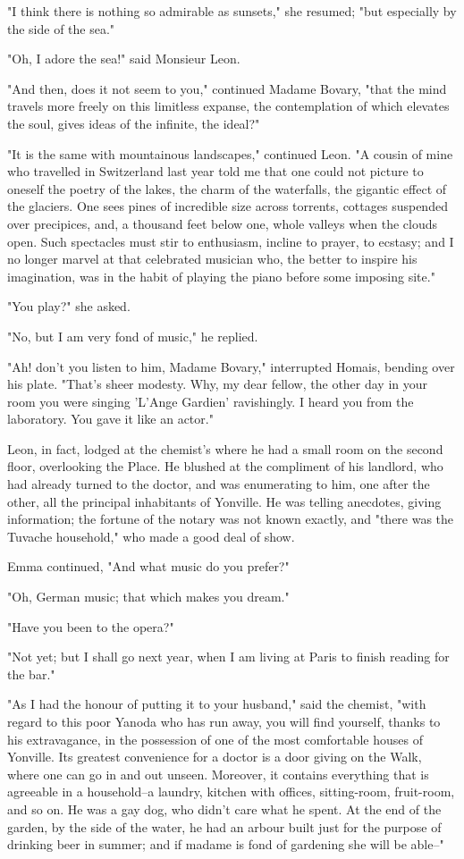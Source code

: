\documentclass[11pt,twocolumn]{ltugboat}
\begin{document}
"I think there is nothing so admirable as sunsets," she resumed; "but
especially by the side of the sea."

"Oh, I adore the sea!" said Monsieur Leon.

"And then, does it not seem to you," continued Madame Bovary, "that the
mind travels more freely on this limitless expanse, the contemplation of
which elevates the soul, gives ideas of the infinite, the ideal?"

"It is the same with mountainous landscapes," continued Leon. "A cousin
of mine who travelled in Switzerland last year told me that one could
not picture to oneself the poetry of the lakes, the charm of the
waterfalls, the gigantic effect of the glaciers. One sees pines of
incredible size across torrents, cottages suspended over precipices,
and, a thousand feet below one, whole valleys when the clouds open. Such
spectacles must stir to enthusiasm, incline to prayer, to ecstasy; and I
no longer marvel at that celebrated musician who, the better to inspire
his imagination, was in the habit of playing the piano before some
imposing site."

"You play?" she asked.

"No, but I am very fond of music," he replied.

"Ah! don't you listen to him, Madame Bovary," interrupted Homais,
bending over his plate. "That's sheer modesty. Why, my dear fellow, the
other day in your room you were singing 'L'Ange Gardien' ravishingly. I
heard you from the laboratory. You gave it like an actor."

Leon, in fact, lodged at the chemist's where he had a small room on the
second floor, overlooking the Place. He blushed at the compliment of his
landlord, who had already turned to the doctor, and was enumerating to
him, one after the other, all the principal inhabitants of Yonville. He
was telling anecdotes, giving information; the fortune of the notary
was not known exactly, and "there was the Tuvache household," who made a
good deal of show.

Emma continued, "And what music do you prefer?"

"Oh, German music; that which makes you dream."

"Have you been to the opera?"

"Not yet; but I shall go next year, when I am living at Paris to finish
reading for the bar."

"As I had the honour of putting it to your husband," said the chemist,
"with regard to this poor Yanoda who has run away, you will find
yourself, thanks to his extravagance, in the possession of one of the
most comfortable houses of Yonville. Its greatest convenience for a
doctor is a door giving on the Walk, where one can go in and out unseen.
Moreover, it contains everything that is agreeable in a household--a
laundry, kitchen with offices, sitting-room, fruit-room, and so on. He
was a gay dog, who didn't care what he spent. At the end of the garden,
by the side of the water, he had an arbour built just for the purpose of
drinking beer in summer; and if madame is fond of gardening she will be
able--"
\end{document}

